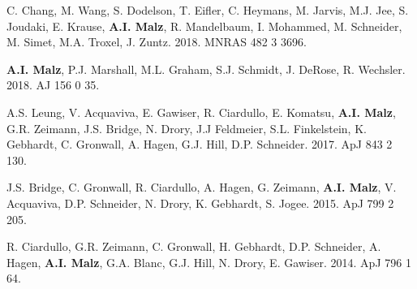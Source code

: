 \begin{etaremune}
\item C. Chang, M. Wang, S. Dodelson, T. Eifler, C. Heymans, M. Jarvis, M.J. Jee, S. Joudaki, E. Krause, {\bf A.I. Malz}, R. Mandelbaum, I. Mohammed, M. Schneider, M. Simet, M.A. Troxel, J. Zuntz. 2018. MNRAS 482 3 3696. 

\item {\bf A.I. Malz}, P.J. Marshall, %
M.L. Graham, S.J. Schmidt, J. DeRose, R. Wechsler. 
2018. AJ 156 0 35. 
  

\item A.S. Leung, V. Acquaviva, E. Gawiser, R. Ciardullo, E. Komatsu, {\bf A.I. Malz}, G.R. Zeimann, %
J.S. Bridge, N. Drory, J.J Feldmeier, S.L. Finkelstein, K. Gebhardt, C. Gronwall, A. Hagen, G.J. Hill, D.P. Schneider. 
2017. ApJ 843 2 130. 

\item J.S. Bridge, C. Gronwall, R. Ciardullo, A. Hagen, G. Zeimann, {\bf A.I. Malz}, V. Acquaviva, D.P. Schneider, N. Drory, K. Gebhardt, S. Jogee. 2015. ApJ 799 2 205. 

\item R. Ciardullo, G.R. Zeimann, C. Gronwall, H. Gebhardt, D.P. Schneider, A. Hagen, {\bf A.I. Malz}, G.A. Blanc, G.J. Hill, N. Drory, E. Gawiser. 2014. ApJ 796 1 64. 


\end{etaremune}
